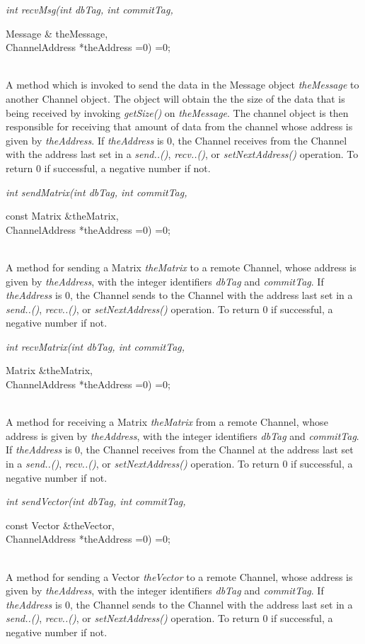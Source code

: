 {\em int recvMsg(int dbTag, int commitTag, 

\indent\indent\indent\indent\indent Message \& theMessage, \\
\indent\indent\indent\indent\indent ChannelAddress *theAddress =0) =0;}\\
A method which is invoked to send the data in the Message object {\em
theMessage} to another Channel object. The object will obtain the
the size of the data that is being received by invoking {\em getSize()}
on {\em theMessage}. The channel object is then responsible for
receiving that amount of data from the channel whose address is given
by {\em theAddress}. If {\em theAddress} is $0$, the Channel receives from
the Channel with the address last set in a {\em send..()}, {\em
recv..()}, or {\em setNextAddress()} operation. To return $0$ if
successful, a negative number if not. \\  


{\em int sendMatrix(int dbTag, int commitTag,  

\indent\indent\indent\indent\indent const Matrix \&theMatrix, \\
\indent\indent\indent\indent\indent ChannelAddress *theAddress =0) =0;}\\
A method for sending a Matrix {\em theMatrix} to a
remote Channel, whose address is given by {\em theAddress}, with the
integer identifiers {\em dbTag} and {\em commitTag}. If {\em theAddress} 
is $0$, the Channel sends to the Channel with the address last set in
a {\em send..()}, {\em recv..()}, or {\em setNextAddress()}
operation. To return $0$ if successful, a negative number if not. \\ 


{\em int recvMatrix(int dbTag, int commitTag, 

\indent\indent\indent\indent\indent Matrix \&theMatrix,  \\
\indent\indent\indent\indent\indent ChannelAddress *theAddress =0) =0;}\\
A method for receiving a Matrix {\em theMatrix} from a
remote Channel, whose address is given by {\em theAddress}, with the
integer identifiers {\em dbTag} and {\em commitTag}. If {\em theAddress} 
is $0$, the Channel receives from the Channel at the address last set
in a {\em send..()}, {\em recv..()}, or {\em setNextAddress()}
operation. To return $0$ if successful, a negative number if not. \\ 

{\em int sendVector(int dbTag, int commitTag,  

\indent\indent\indent\indent\indent const Vector \&theVector, \\
\indent\indent\indent\indent\indent ChannelAddress *theAddress =0) =0;}\\
A method for sending a Vector {\em theVector} to a
remote Channel, whose address is given by {\em theAddress}, with the
integer identifiers {\em dbTag} and {\em commitTag}. If {\em theAddress} 
is $0$, the Channel sends to the Channel with the address last set in
a {\em send..()}, {\em recv..()}, or {\em setNextAddress()}
operation. To return $0$ if successful, a negative number if not. \\ 


